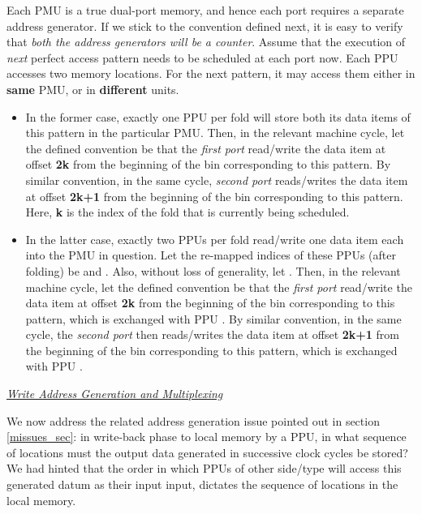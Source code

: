 \documentclass[12pt]{article}
\begin{document}
Each PMU is a true dual-port memory, and hence each port requires
a separate address generator. If we stick to the
convention defined next, it is easy to verify that \textit{both the address
generators will be a counter}. Assume that the execution of
\textit{next}
perfect access pattern needs to be scheduled at each port now. Each PPU accesses two memory locations. For the next pattern, it may access
them either in \textbf{same} PMU, or in \textbf{different} 
units.
\begin{itemize}
\item In the former case, exactly one PPU per fold will store
both its data items of this pattern in the particular PMU. Then,
in the relevant machine cycle, let the defined convention be that the
\textit{first port} read/write the data item at offset \textbf{2k} from the
beginning of the bin corresponding to this pattern.
By similar convention, in the same cycle,  \textit{second port} reads/writes the data item at offset
\textbf{2k+1} from the beginning of the bin corresponding to this pattern.
Here, \textbf{k} is the index of the fold that is currently being
scheduled.
\item In the latter case, exactly two PPUs per
 fold read/write one data item each into the
PMU in question.
Let the re-mapped indices of these PPUs (after folding) be
 and . Also, without loss of generality, let
  . Then, in the relevant machine cycle,
let the defined convention be that the \textit{first port} read/write the
data item at offset \textbf{2k} from the beginning of the bin corresponding
to this pattern, which is exchanged with PPU .
By similar convention, in the same cycle, 
the \textit{second port} then reads/writes the data
item at offset \textbf{2k+1} from the beginning of the bin corresponding to
this pattern, which is exchanged with PPU .
\end{itemize}

\noindent \uline{\textit{Write Address Generation and Multiplexing}}

We now address the related address generation issue pointed out in section
\ref{missues_sec}: in write-back phase to local memory by a PPU, in what sequence of locations must the output data generated in
successive clock cycles be stored? We had hinted that the order in which
PPUs of other side/type will access this generated datum as
their input input, dictates the sequence of locations in the local memory.
\end{document}
